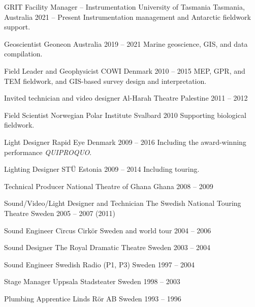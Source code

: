 \documentclass[11pt, a4paper]{cvClass}
\begin{document}
\begin{cventries}
  \cventry
    {GRIT Facility Manager – Instrumentation}
    {University of Tasmania}
    {Tasmania, Australia}
    {2021 -- Present}
    {Instrumentation management and Antarctic fieldwork support.}

  \cventry
    {Geoscientist}
    {Geoneon}
    {Australia}
    {2019 -- 2021}
    {Marine geoscience, GIS, and data compilation.}

  \cventry
    {Field Leader and Geophysicist}
    {COWI}
    {Denmark}
    {2010 -- 2015}
    {MEP, GPR, and TEM fieldwork, and GIS-based survey design and interpretation.}

  \cventry
    {Invited technician and video designer}
    {Al-Harah Theatre}
    {Palestine}
    {2011 -- 2012}
    {}

  \cventry
    {Field Scientist}
    {Norwegian Polar Institute}
    {Svalbard}
    {2010}
    {Supporting biological fieldwork.}

  \cventry
    {Light Designer}
    {Rapid Eye}
    {Denmark}
    {2009 -- 2016}
    {Including the award-winning performance \textit{QUIPROQUO}.}

  \cventry
    {Lighting Designer}
    {STÜ}
    {Estonia}
    {2009 -- 2014}
    {Including touring.}

  \cventry
    {Technical Producer}
    {National Theatre of Ghana}
    {Ghana}
    {2008 -- 2009}
    {}

  \cventry
    {Sound/Video/Light Designer and Technician}
    {The Swedish National Touring Theatre}
    {Sweden}
    {2005 -- 2007 (2011)}
    {}

  \cventry
    {Sound Engineer}
    {Circus Cirkör}
    {Sweden and world tour}
    {2004 -- 2006}
    {}

  \cventry
    {Sound Designer}
    {The Royal Dramatic Theatre}
    {Sweden}
    {2003 -- 2004}
    {}

  \cventry
    {Sound Engineer}
    {Swedish Radio (P1, P3)}
    {Sweden}
    {1997 -- 2004}
    {}

  \cventry
    {Stage Manager}
    {Uppsala Stadsteater}
    {Sweden}
    {1998 -- 2003}
    {}

  \cventry
    {Plumbing Apprentice}
    {Linds Rör AB}
    {Sweden}
    {1993 -- 1996}
    {}
\end{cventries}

\end{document}
